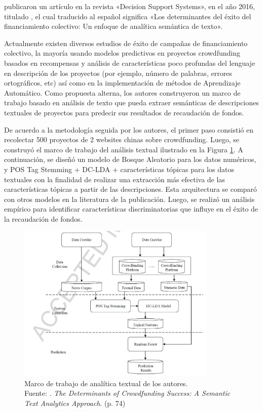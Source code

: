 \newpage
\cite{pr_yuan2016textanalytics} publicaron un artículo en la revista «Decision Support Systems», en el año 2016, titulado , el cual traducido al español significa «Los determinantes del éxito del financiamiento colectivo: Un enfoque de analítica semántica de texto».

Actualmente existen diversos estudios de éxito de campañas de financiamiento colectivo, la mayoría usando modelos predictivos en proyectos crowdfunding basados en recompensas y análisis de características poco profundas del lenguaje en descripción de los proyectos (por ejemplo, número de palabras, errores ortográficos, etc) así como en la implementación de métodos de Aprendizaje Automático. Como propuesta alterna, los autores construyeron un marco de trabajo basado en análisis de texto que pueda extraer semánticas de descripciones textuales de proyectos para predecir sus resultados de recaudación de fondos.

De acuerdo a la metodología seguida por los autores, el primer paso consistió en recolectar 500 proyectos de 2 websites chinas sobre crowdfunding. Luego, se construyó el marco de trabajo del análisis textual ilustrado en la Figura \ref{2:fig117}. A continuación, se diseñó un modelo de Bosque Aleatorio para los datos numéricos, y POS Tag Stemming + DC-LDA + características tópicas para los datos textuales con la finalidad de realizar una extracción más efectiva de las características tópicas a partir de las descripciones. Esta arquitectura se comparó con otros modelos en la literatura de la publicación. Luego, se realizó un análisis empírico para identificar características discriminatorias que influye en el éxito de la recaudación de fondos.

\begin{figure}[!ht]
	\begin{center}
		\includegraphics[width=0.85\textwidth]{2/figures/yuan2016a.jpg}
		\caption[Marco de trabajo de analítica textual de los autores]{Marco de trabajo de analítica textual de los autores.\\
		Fuente: \cite{pr_yuan2016textanalytics}. \textit{The Determinants of Crowdfunding Success: A Semantic Text Analytics Approach}. (p. 74)}
		\label{2:fig117}
	\end{center}
\end{figure}

